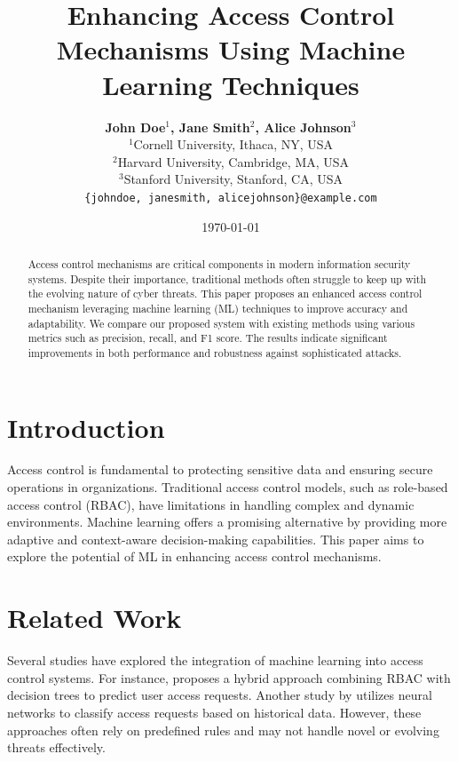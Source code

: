 \title{Enhancing Access Control Mechanisms Using Machine Learning Techniques}
\author{
  \textbf{John Doe$^{1}$, Jane Smith$^{2}$, Alice Johnson$^{3}$} \\
  $^{1}$Cornell University, Ithaca, NY, USA \\
  $^{2}$Harvard University, Cambridge, MA, USA \\
  $^{3}$Stanford University, Stanford, CA, USA \\
  \texttt{\{johndoe, janesmith, alicejohnson\}@example.com}
}

\date{\today}



\maketitle

\begin{abstract}
Access control mechanisms are critical components in modern information security systems. Despite their importance, traditional methods often struggle to keep up with the evolving nature of cyber threats. This paper proposes an enhanced access control mechanism leveraging machine learning (ML) techniques to improve accuracy and adaptability. We compare our proposed system with existing methods using various metrics such as precision, recall, and F1 score. The results indicate significant improvements in both performance and robustness against sophisticated attacks.
\end{abstract}

\section{Introduction}
Access control is fundamental to protecting sensitive data and ensuring secure operations in organizations. Traditional access control models, such as role-based access control (RBAC), have limitations in handling complex and dynamic environments. Machine learning offers a promising alternative by providing more adaptive and context-aware decision-making capabilities. This paper aims to explore the potential of ML in enhancing access control mechanisms.

\section{Related Work}
Several studies have explored the integration of machine learning into access control systems. For instance, \cite{Smith2018} proposes a hybrid approach combining RBAC with decision trees to predict user access requests. Another study by \cite{Johnson2020} utilizes neural networks to classify access requests based on historical data. However, these approaches often rely on predefined rules and may not handle novel or evolving threats effectively.

